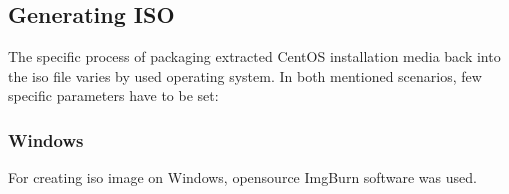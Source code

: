 \documentclass[
  printed, %
  table,   %
  lof,     %
  lot,     %
           oneside, color
]{fithesis3}
\renewcommand{\texttt}[1]{%
  \begingroup
  \ttfamily
  \begingroup\lccode`~=`/\lowercase{\endgroup\def~}{/\discretionary{}{}{}}%
  \begingroup\lccode`~=`[\lowercase{\endgroup\def~}{[\discretionary{}{}{}}%
  \begingroup\lccode`~=`.\lowercase{\endgroup\def~}{.\discretionary{}{}{}}%
  \catcode`/=\active\catcode`[=\active\catcode`.=\active
  \scantokens{#1\noexpand}%
  \endgroup
}
\begin{document}
\subsection{Generating ISO}
The specific process of packaging extracted CentOS installation media back into the iso file varies by used operating system. In both mentioned scenarios, few specific parameters have to be set:
\subsubsection{Windows}
For creating iso image on Windows, opensource ImgBurn software was used. 
\end{document}
